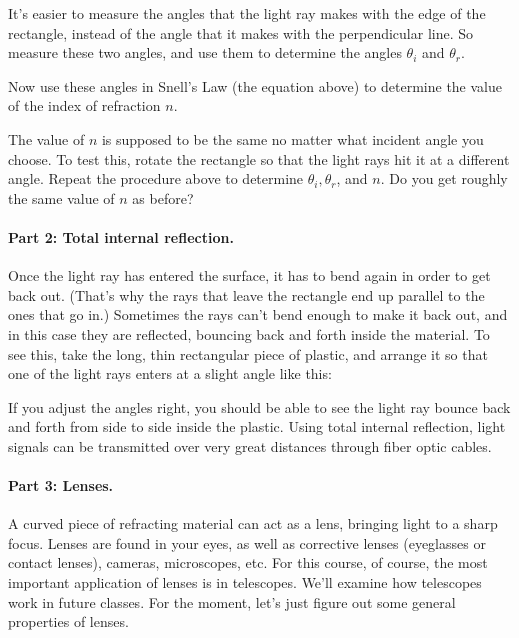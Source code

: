 \documentclass[twoside]{report}
\begin{document}
\centerline{\epsfxsize 3in}


It's easier to measure the angles that the light ray makes with
the edge of the rectangle, instead of the angle that it makes with
the perpendicular line.  So measure these two angles, and use them
to determine the angles $\theta_i$ and $\theta_r$.

\vskip 1.5in

Now use these angles in Snell's Law (the equation above) to determine
the value of the index of refraction $n$.

\vskip 1.5in

The value of $n$ is supposed to be the same no matter what incident angle
you choose.  To test this, rotate the rectangle so that the light
rays hit it at a different angle.  Repeat the procedure above to determine
$\theta_i,\theta_r$, and $n$.  Do you get roughly the same value of $n$ as
before?

\vskip 3in

\paragraph{Part 2: Total internal reflection.}
Once the light ray has entered the surface, it has to bend again
in order to get back out.  (That's why the rays that leave the rectangle
end up parallel to the ones that go in.)  Sometimes the rays can't bend
enough to make it back out, and in this case they are reflected, bouncing
back and forth inside the material.  To see this, take the long, thin
rectangular piece of plastic, and arrange it so that one of the light
rays enters at a slight angle like this:

\centerline{\epsfxsize 3in}



If you adjust the angles right, you should be able to see the light ray
bounce back and forth from side to side inside the plastic.  
Using total internal reflection, 
light signals can be transmitted over very great distances through
fiber optic cables.

\paragraph{Part 3: Lenses.}
A curved piece of refracting material can act as a lens, bringing
light to a sharp focus.  Lenses are found in your eyes, as well as
corrective lenses (eyeglasses or contact lenses), cameras,
microscopes, etc.  For this course, of course, the most important
application of lenses is in telescopes.  We'll examine how telescopes
work in future classes.  For the moment, let's just figure
out some general properties of lenses.
\end{document}
